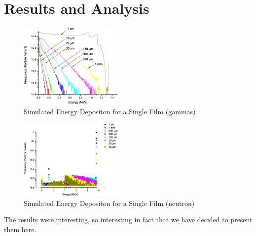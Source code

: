 \documentclass{anstrans}
\newcommand{\figurewidth}{0.45\textwidth}
\begin{document}
\section{Results and Analysis}
\begin{figure}[h]
    \includegraphics[width=\figurewidth]{PS_EDepSim_Co60}
	\caption{Simulated Energy Depositon for a Single Film (gammas)}
    \label{fig:SimEDepGamma}
\end{figure}
\begin{figure}[h]
    \includegraphics[width=\figurewidth]{PS_EDepSim_Neutron}
	\caption{Simulated Energy Depositon for a Single Film (neutron)}
    \label{fig:SimEDepGamma}
\end{figure}
The results were interesting, so interesting in fact that we have decided to
present them here.
\end{document}
